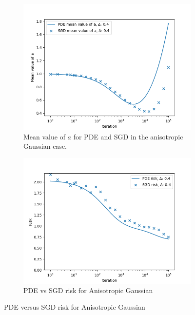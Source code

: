 \documentclass{article}
\theoremstyle{mystyle}
\begin{document}
\vspace{3cm}
\begin{figure}[H]
 \begin{subfigure}{0.5\textwidth}
   \centering
   \includegraphics[width=\linewidth]{images/NGuyen2018-pde-sgd-gauss-anisotropic.png}
   \caption{Mean value of $ a$ for PDE and SGD in the anisotropic Gaussian case.}
   \label{fig: val a anisotropic}
 \end{subfigure}%
 \begin{subfigure}{0.5\textwidth}
   \centering
   \includegraphics[width=\linewidth]{images/NGuyen2018-pde-sgd-risk-gauss-anisotropic.png}
   \caption{PDE vs SGD risk for Anisotropic Gaussian}
   \label{fig: risk anisotropic}
 \end{subfigure}
 \caption{ PDE versus SGD risk for Anisotropic Gaussian}
 \label{fig: anisotropic gaussian case plots}
 \end{figure} 
\end{document}
